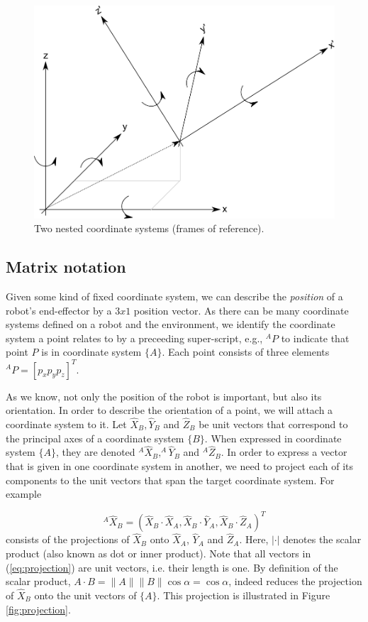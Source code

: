\begin{figure}
	\centering
		\includegraphics[width=\textwidth]{figs/frameofreference.png}
	\caption{Two nested coordinate systems (frames of reference).}
	\label{fig:for}
\end{figure}

\subsection{Matrix notation}
Given some kind of fixed coordinate system, we can describe the \emph{position} of a robot's end-effector by a $3x1$ position vector. As there can be many coordinate systems defined on a robot and the environment, we identify the coordinate system a point relates to by a preceeding super-script, e.g., $ ^AP$ to indicate that point $P$ is in coordinate system $\{A\}$. Each point consists of three elements $ ^AP=[p_x p_y p_z]^T$.

As we know, not only the position of the robot is important, but also its orientation. In order to describe the orientation of a point, we will attach a coordinate system to it. Let $ \hat{X}_B, \hat{Y}_B$ and $ \hat{Z}_B$ be unit vectors that correspond to the principal axes of a coordinate system $\{B\}$. When expressed in coordinate system $\{A\}$, they are denoted $^A\hat{X}_B, ^A\hat{Y}_B$ and $ ^A\hat{Z}_B$. In order to express a vector that is given in one coordinate system in another, we need to project each of its components to the unit vectors that span the target coordinate system. For example

\begin{equation}\label{eq:projection}
^A\hat{X}_B=(\hat{X}_B\cdot\hat{X}_A, \hat{X}_B\cdot\hat{Y}_A,\hat{X}_B\cdot\hat{Z}_A)^T
\end{equation}
consists of the projections of $\hat{X}_B$ onto $\hat{X}_A$, $\hat{Y}_A$ and $\hat{Z}_A$. Here,  $|\cdot|$ denotes the scalar product (also known as dot or inner product).  Note that all vectors in (\ref{eq:projection}) are unit vectors, i.e. their length is one. By definition of the scalar product, $A\cdot B=\|A\|\|B\|\cos \alpha=\cos \alpha$, indeed reduces the projection of $\hat{X}_B$ onto the unit vectors of $\{A\}$. This projection is illustrated in Figure \ref{fig:projection}.

